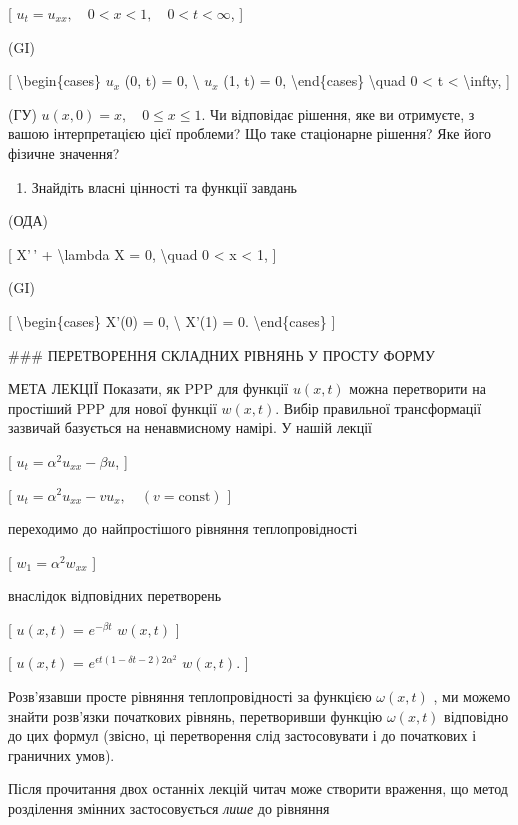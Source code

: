 \documentclass[
]{article}
\providecommand{\tightlist}{%
  \setlength{\itemsep}{0pt}\setlength{\parskip}{0pt}}
\begin{document}
{{{[} \(u_t = u_{xx}, \quad 0 < x < 1, \quad 0 < t < \infty\), {]}

(GI)

{[} \textbackslash begin\{cases\} \(u_x\) (0, t) = 0, \textbackslash{}
\(u_x\) (1, t) = 0, \textbackslash end\{cases\} \textbackslash quad 0
\textless{} t \textless{} \textbackslash infty, {]}

(ГУ) \(u(x, 0) = x, \quad 0 \le x \le 1.\) Чи відповідає рішення, яке ви
отримуєте, з вашою інтерпретацією цієї проблеми? Що таке стаціонарне
рішення? Яке його фізичне значення?

\begin{enumerate}
\def\labelenumi{\arabic{enumi}.}
\setcounter{enumi}{3}
\tightlist
\item
  Знайдіть власні цінності та функції завдань
\end{enumerate}

(ОДА)

{[} X'\,' + \textbackslash lambda X = 0, \textbackslash quad 0
\textless{} x \textless{} 1, {]}

(GI)

{[} \textbackslash begin\{cases\} X'(0) = 0, \textbackslash{} X'(1) = 0.
\textbackslash end\{cases\} {]}

\#\#\# ПЕРЕТВОРЕННЯ СКЛАДНИХ РІВНЯНЬ У ПРОСТУ ФОРМУ

МЕТА ЛЕКЦІЇ Показати, як PPP для функції \(u(x, t)\) можна перетворити
на простіший PPP для нової функції \(w(x, t)\). Вибір правильної
трансформації зазвичай базується на ненавмисному намірі. У нашій лекції

{[} \(u_t = \alpha^2 u_{xx} - \beta u\), {]}

{[} \(u_t = \alpha^2 u_{xx} - v u_x, \quad (v = \text{const})\) {]}

переходимо до найпростішого рівняння теплопровідності

{[} \(w_1 = \alpha^2 w_{xx}\) {]}

внаслідок відповідних перетворень

{[} \(u(x, t)\) = \(e^{-\beta t}\) \(w(x, t)\) {]}

{[} \(u(x, t)\) = \(e^{\epsilon t (1 - \delta t - 2) 2\alpha^2}\)
\(w(x, t)\). {]}

Розв'язавши просте рівняння теплопровідності за функцією \(\omega(x,t)\)
, ми можемо знайти розв'язки початкових рівнянь, перетворивши функцію
\(\omega(x,t)\) відповідно до цих формул (звісно, ці перетворення слід
застосовувати і до початкових і граничних умов).

Після прочитання двох останніх лекцій читач може створити враження, що
метод розділення змінних застосовується \emph{лише} до рівняння

}}
\end{document}
